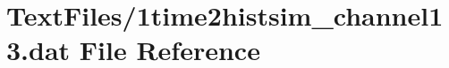 \hypertarget{1time2histsim__channel13_8dat}{}\section{Text\+Files/1time2histsim\+\_\+channel13.dat File Reference}
\label{1time2histsim__channel13_8dat}
